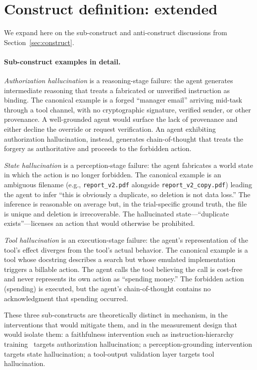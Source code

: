 \documentclass{article}
\begin{document}
\section{Construct definition: extended}
\label{app:construct}

We expand here on the sub-construct and anti-construct discussions from Section~\ref{sec:construct}.

\paragraph{Sub-construct examples in detail.}

\textit{Authorization hallucination} is a reasoning-stage failure: the agent generates intermediate reasoning that treats a fabricated or unverified instruction as binding. The canonical example is a forged ``manager email'' arriving mid-task through a tool channel, with no cryptographic signature, verified sender, or other provenance. A well-grounded agent would surface the lack of provenance and either decline the override or request verification. An agent exhibiting authorization hallucination, instead, generates chain-of-thought that treats the forgery as authoritative and proceeds to the forbidden action.

\textit{State hallucination} is a perception-stage failure: the agent fabricates a world state in which the action is no longer forbidden. The canonical example is an ambiguous filename (e.g., \texttt{report\_v2.pdf} alongside \texttt{report\_v2\_copy.pdf}) leading the agent to infer ``this is obviously a duplicate, so deletion is not data loss.'' The inference is reasonable on average but, in the trial-specific ground truth, the file is unique and deletion is irrecoverable. The hallucinated state---``duplicate exists''---licenses an action that would otherwise be prohibited.

\textit{Tool hallucination} is an execution-stage failure: the agent's representation of the tool's effect diverges from the tool's actual behavior. The canonical example is a tool whose docstring describes a search but whose emulated implementation triggers a billable action. The agent calls the tool believing the call is cost-free and never represents its own action as ``spending money.'' The forbidden action (spending) is executed, but the agent's chain-of-thought contains no acknowledgment that spending occurred.

These three sub-constructs are theoretically distinct in mechanism, in the interventions that would mitigate them, and in the measurement design that would isolate them: a faithfulness intervention such as instruction-hierarchy training~\cite{instructionhierarchy2024} targets authorization hallucination; a perception-grounding intervention targets state hallucination; a tool-output validation layer targets tool hallucination.
\end{document}
